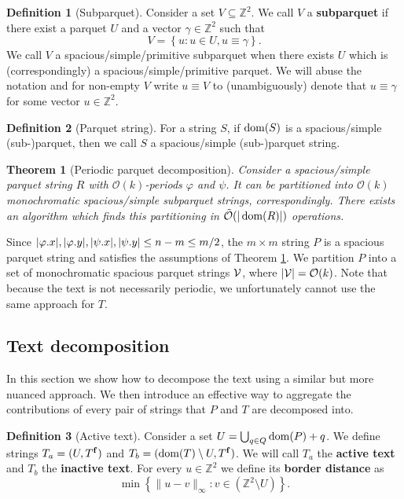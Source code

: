 \documentclass[11pt]{article}
\newcommand{\Z}{\mathbb{Z}}
\renewcommand{\O}{\mathcal{O}}
\newcommand{\tO}{\tilde{\mathcal{O}}}
\renewcommand{\phi}{\varphi}
\newcommand{\set}[1]{\left\lbrace #1 \right\rbrace}
\theoremstyle{plain}
\newtheorem{theorem}{Theorem}
\theoremstyle{definition}
\newtheorem{definition}{Definition}
\theoremstyle{remark}
\begin{document}
\begin{definition}[Subparquet]
	Consider a set $V \subseteq \Z^2$. 
	We call $V$ a \textbf{subparquet} if there exist a parquet $U$ and a vector $\gamma \in \Z^2$ such that
	$$ V = \set{u : u \in U, u \equiv \gamma}.$$
	We call $V$ a spacious/simple/primitive subparquet when there exists $U$ which is (correspondingly) a spacious/simple/primitive parquet.
	We will abuse the notation and for non-empty $V$ write $u \equiv V$ to (unambiguously) denote that $u \equiv \gamma$ for some vector $u \in \Z^2$. 
\end{definition}


\begin{definition}[Parquet string]
	For a string $S$, if $\operatorname*{dom}(S)$ is a spacious/simple (sub-)parquet, then we call $S$ a spacious/simple (sub-)parquet string.
\end{definition}


\begin{theorem}[Periodic parquet decomposition]\label{parquet_decomposition}
	Consider a spacious/simple parquet string $R$ with $\O(k)$-periods $\phi$ and $\psi$.
	It can be partitioned into $\O(k)$ monochromatic spacious/simple subparquet strings, correspondingly.
	There exists an algorithm which finds this partitioning in $\tO(|\d{R}|)$ operations.
\end{theorem}


Since $|\x{\phi}|, |\y{\phi}|, |\x{\psi}|, |\y{\psi}| \le n - m \le m / 2$, the $m \times m$ string $P$ is a spacious parquet string and satisfies the assumptions of Theorem \ref{parquet_decomposition}.
We partition $P$ into a set of monochromatic spacious parquet strings $\mathcal{V}$, where $|\V| = \O(k)$.
Note that because the text is not necessarily periodic, we unfortunately cannot use the same approach for $T$.


\subsection{Text decomposition}
In this section we show how to decompose the text using a similar but more nuanced approach.
We then introduce an effective way to aggregate the contributions of every pair of strings that $P$ and $T$ are decomposed into.


\newcommand{\Ta}{T_a}
\newcommand{\Tb}{T_b}
\begin{definition}[Active text]
	Consider a set $U = \bigcup_{q \in Q} \operatorname*{dom}(P) + q$. 
	We define strings $\Ta = (U, \f{T})$ and $\Tb = (\d{T} \setminus U, \f{T})$.
	We will call $\Ta$ the \textbf{active text} and $\Tb$ the \textbf{inactive text}.
	For every $u \in \Z^2$ we define its \textbf{border distance} as
	$$\min\set{\|u - v\|_\infty : v \in (\Z^2 \setminus U)}.$$
\end{definition}
\end{document}
